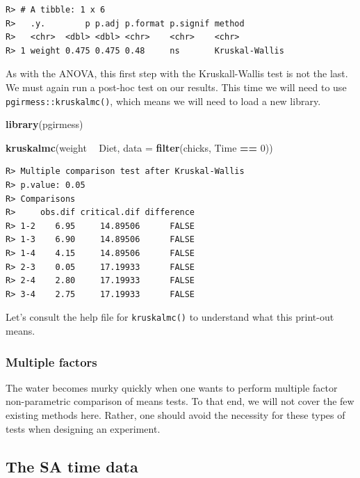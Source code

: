 \documentclass[english,10pt,a4paper,oneside]{book}
\newenvironment{Shaded}{\begin{snugshade}}{\end{snugshade}}
\newcommand{\DataTypeTok}[1]{\textcolor[rgb]{0.13,0.29,0.53}{#1}}
\newcommand{\DecValTok}[1]{\textcolor[rgb]{0.00,0.00,0.81}{#1}}
\newcommand{\KeywordTok}[1]{\textcolor[rgb]{0.13,0.29,0.53}{\textbf{#1}}}
\newcommand{\NormalTok}[1]{#1}
\newcommand{\OperatorTok}[1]{\textcolor[rgb]{0.81,0.36,0.00}{\textbf{#1}}}
\newcommand{\StringTok}[1]{\textcolor[rgb]{0.31,0.60,0.02}{#1}}
\theoremstyle{definition}
\theoremstyle{definition}
\theoremstyle{definition}
\theoremstyle{remark}
\begin{document}
\begin{verbatim}
R> # A tibble: 1 x 6
R>   .y.        p p.adj p.format p.signif method        
R>   <chr>  <dbl> <dbl> <chr>    <chr>    <chr>         
R> 1 weight 0.475 0.475 0.48     ns       Kruskal-Wallis
\end{verbatim}

As with the ANOVA, this first step with the Kruskall-Wallis test is not
the last. We must again run a post-hoc test on our results. This time we
will need to use \texttt{pgirmess::kruskalmc()}, which means we will
need to load a new library.

\begin{Shaded}
\begin{Highlighting}[]
\KeywordTok{library}\NormalTok{(pgirmess)}

\KeywordTok{kruskalmc}\NormalTok{(weight }\OperatorTok{~}\StringTok{ }\NormalTok{Diet, }\DataTypeTok{data =} \KeywordTok{filter}\NormalTok{(chicks, Time }\OperatorTok{==}\StringTok{ }\DecValTok{0}\NormalTok{))}
\end{Highlighting}
\end{Shaded}

\begin{verbatim}
R> Multiple comparison test after Kruskal-Wallis 
R> p.value: 0.05 
R> Comparisons
R>     obs.dif critical.dif difference
R> 1-2    6.95     14.89506      FALSE
R> 1-3    6.90     14.89506      FALSE
R> 1-4    4.15     14.89506      FALSE
R> 2-3    0.05     17.19933      FALSE
R> 2-4    2.80     17.19933      FALSE
R> 3-4    2.75     17.19933      FALSE
\end{verbatim}

Let's consult the help file for \texttt{kruskalmc()} to understand what
this print-out means.

\hypertarget{multiple-factors-1}{%
\subsubsection{Multiple factors}\label{multiple-factors-1}}

The water becomes murky quickly when one wants to perform multiple
factor non-parametric comparison of means tests. To that end, we will
not cover the few existing methods here. Rather, one should avoid the
necessity for these types of tests when designing an experiment.

\hypertarget{the-sa-time-data}{%
\subsection{The SA time data}\label{the-sa-time-data}}
\end{document}
